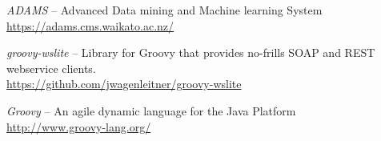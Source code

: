 %

\begin{thebibliography}{999}

		\textit{ADAMS} -- Advanced Data mining and Machine learning System \\
		\url{https://adams.cms.waikato.ac.nz/}{}
		
		\textit{groovy-wslite} -- Library for Groovy that provides
		no-frills SOAP and REST webservice clients. \\
		\url{https://github.com/jwagenleitner/groovy-wslite}{}

		\textit{Groovy} -- An agile dynamic language for the Java Platform \\
		\url{http://www.groovy-lang.org/}{}

\end{thebibliography}
